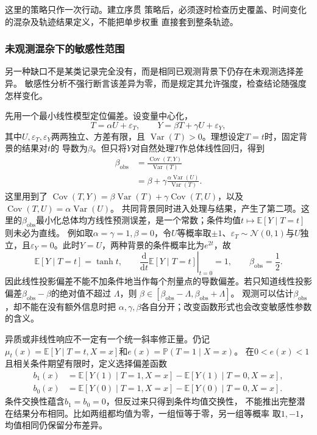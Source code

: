 这里的策略只作一次行动。建立序贯
策略后，必须逐时检查历史覆盖、时间变化的混杂及轨迹结果定义，不能把单步权重
直接套到整条轨迹。

\subsubsection{未观测混杂下的敏感性范围}
\label{sec:causal-sensitivity-ranges}

另一种缺口不是某类记录完全没有，而是相同已观测背景下仍存在未观测选择差异。
敏感性分析不强行断言该差异为零，而是规定其允许强度，检查结论随强度怎样变化。

先用一个最小线性模型定位偏差。设变量中心化，
\[
  T=\alpha U+\varepsilon_T,\qquad
  Y=\beta T+\gamma U+\varepsilon_Y,
\]
其中\(U,\varepsilon_T,\varepsilon_Y\)两两独立、方差有限，且
\(\operatorname{Var}(T)>0\)。理想设定\(T=t\)时，固定背景的结果对\(t\)的
导数为\(\beta\)。但只将\(Y\)对自然处理\(T\)作总体线性回归，得到
\begin{equation}
  \begin{aligned}
    \beta_{\mathrm{obs}}
    &=\frac{\operatorname{Cov}(T,Y)}{\operatorname{Var}(T)}\\
    &=\beta+
      \gamma\frac{\alpha\operatorname{Var}(U)}{\operatorname{Var}(T)}.
  \end{aligned}
  \label{eq:causal-linear-confounding-bias}
\end{equation}
这里用到了
\(\operatorname{Cov}(T,Y)=\beta\operatorname{Var}(T)
+\gamma\operatorname{Cov}(T,U)\)，以及
\(\operatorname{Cov}(T,U)=\alpha\operatorname{Var}(U)\)。
共同背景同时进入处理与结果，产生了第二项。这里的\(\beta_{\mathrm{obs}}\)最小化总体均方线性预测误差，是一个常数；条件均值\(t\mapsto\mathbb E[Y\mid T=t]\)则未必为直线。
例如取\(\alpha=\gamma=1,\beta=0\)，令\(U\)等概率取\(\pm1\)、\(\varepsilon_T\sim\mathcal N(0,1)\)与\(U\)独立，且\(\varepsilon_Y=0\)。此时\(Y=U\)，两种背景的条件概率比为\(e^{2t}\)，故
\[
 \mathbb E[Y\mid T=t]=\tanh t,\qquad
 \left.\frac{\mathrm d}{\mathrm dt}\mathbb E[Y\mid T=t]\right|_{t=0}=1,
 \qquad\beta_{\mathrm{obs}}=\frac12.
\]
因此线性投影偏差不能不加条件地当作每个剂量点的导数偏差。若只知道线性投影偏差\(\beta_{\mathrm{obs}}-\beta\)的绝对值不超过
\(\Lambda\)，则
\(\beta\in[\beta_{\mathrm{obs}}-\Lambda,\beta_{\mathrm{obs}}+\Lambda]\)。
观测可以估计\(\beta_{\mathrm{obs}}\)，却不能在没有额外信息时把
\(\alpha,\gamma,\beta\)各自分开；改变函数形式也会改变敏感性参数的含义。

异质或非线性响应不一定有一个统一斜率修正量。仍记
\(\mu_t(x)=\mathbb E[Y\mid T=t,X=x]\)和\(e(x)=\mathbb P(T=1\mid X=x)\)。
在\(0<e(x)<1\)且相关条件期望有限时，定义选择偏差函数
\[
  \begin{aligned}
    b_1(x)&=\mathbb E[Y(1)\mid T=1,X=x]
            -\mathbb E[Y(1)\mid T=0,X=x],\\
    b_0(x)&=\mathbb E[Y(0)\mid T=1,X=x]
            -\mathbb E[Y(0)\mid T=0,X=x].
  \end{aligned}
\]
条件交换性蕴含\(b_1=b_0=0\)，但反过来只得到条件均值交换性，
不能推出完整潜在结果分布相同。比如两组都均值为零，一组恒等于零，另一组等概率
取\(1,-1\)，均值相同仍保留分布差异。

